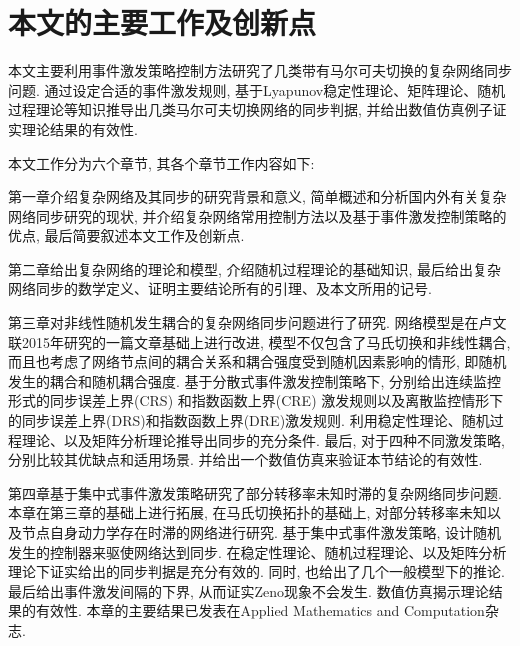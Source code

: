%


\section{本文的主要工作及创新点}

本文主要利用事件激发策略控制方法研究了几类带有马尔可夫切换的复杂网络同步问题. 通过设定合适的事件激发规则, 基于Lyapunov稳定性理论、矩阵理论、随机过程理论等知识推导出几类马尔可夫切换网络的同步判据, 并给出数值仿真例子证实理论结果的有效性.

本文工作分为六个章节, 其各个章节工作内容如下:

第一章介绍复杂网络及其同步的研究背景和意义, 简单概述和分析国内外有关复杂网络同步研究的现状, 并介绍复杂网络常用控制方法以及基于事件激发控制策略的优点, 最后简要叙述本文工作及创新点.

第二章给出复杂网络的理论和模型, 介绍随机过程理论的基础知识, 最后给出复杂网络同步的数学定义、证明主要结论所有的引理、及本文所用的记号.

第三章对非线性随机发生耦合的复杂网络同步问题进行了研究. 网络模型是在卢文联2015年研究的一篇文章基础上进行改进, 模型不仅包含了马氏切换和非线性耦合, 而且也考虑了网络节点间的耦合关系和耦合强度受到随机因素影响的情形, 即随机发生的耦合和随机耦合强度. 基于分散式事件激发控制策略下, 分别给出连续监控形式的同步误差上界(CRS) 和指数函数上界(CRE) 激发规则以及离散监控情形下的同步误差上界(DRS)和指数函数上界(DRE)激发规则. 利用稳定性理论、随机过程理论、以及矩阵分析理论推导出同步的充分条件. 最后, 对于四种不同激发策略, 分别比较其优缺点和适用场景. 并给出一个数值仿真来验证本节结论的有效性.

第四章基于集中式事件激发策略研究了部分转移率未知时滞的复杂网络同步问题. 本章在第三章的基础上进行拓展, 在马氏切换拓扑的基础上, 对部分转移率未知以及节点自身动力学存在时滞的网络进行研究. 基于集中式事件激发策略, 设计随机发生的控制器来驱使网络达到同步. 在稳定性理论、随机过程理论、以及矩阵分析理论下证实给出的同步判据是充分有效的. 同时, 也给出了几个一般模型下的推论. 最后给出事件激发间隔的下界, 从而证实Zeno现象不会发生. 数值仿真揭示理论结果的有效性. 本章的主要结果已发表在Applied Mathematics and Computation杂志.

